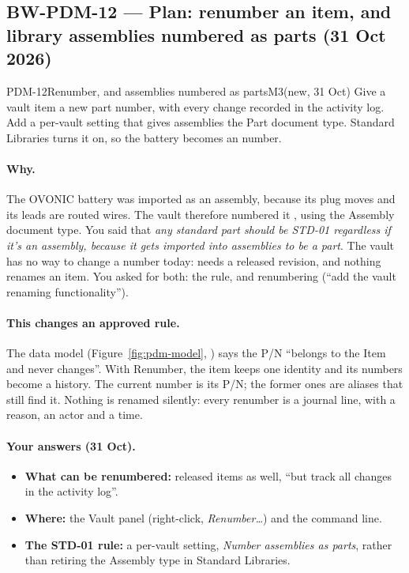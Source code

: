 \subsection{BW-PDM-12 --- Plan: renumber an item, and library assemblies numbered as parts (31 Oct 2026)}\label{sec:pdm12-plan}

\begin{epic}{PDM-12}{Renumber, and assemblies numbered as parts}{M3}{\stProg}{(new, 31 Oct)}
Give a vault item a new part number, with every change recorded in the activity log. Add a per-vault setting that
gives assemblies the Part document type. Standard Libraries turns it on, so the battery becomes an 
number.
\end{epic}

\paragraph{Why.} The OVONIC battery was imported as an assembly, because its plug moves and its leads are routed
wires. The vault therefore numbered it , using the Assembly document type. You said that
\emph{any standard part should be STD-01 regardless if it's an assembly, because it gets imported into assemblies
to be a part}. The vault has no way to change a number today:  needs a released revision, and nothing
renames an item. You asked for both: the rule, and renumbering (``add the vault renaming functionality'').

\paragraph{This changes an approved rule.} The data model (Figure~\ref{fig:pdm-model}, ) says the
P/N ``belongs to the Item and never changes''. With Renumber, the item keeps one identity and its numbers become a
history. The current number is its P/N; the former ones are aliases that still find it. Nothing is renamed silently:
every renumber is a journal line, with a reason, an actor and a time.

\paragraph{Your answers (31 Oct).}
\begin{itemize}[nosep]
  \item \textbf{What can be renumbered:} released items as well, ``but track all changes in the activity log''.
  \item \textbf{Where:} the Vault panel (right-click, \emph{Renumber\ldots}) and the command line.
  \item \textbf{The STD-01 rule:} a per-vault setting, \emph{Number assemblies as parts}, rather than retiring the
        Assembly type in Standard Libraries.
\end{itemize}

